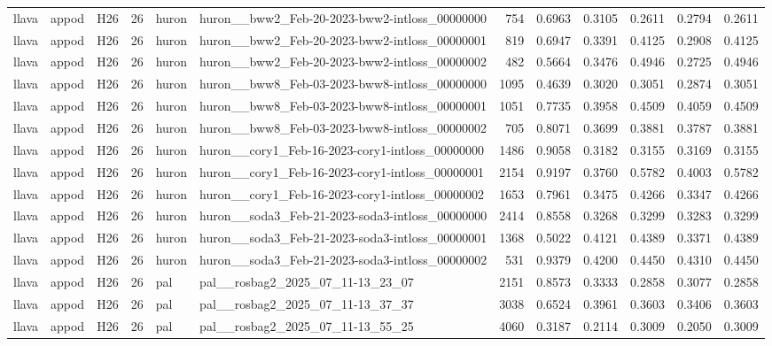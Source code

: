 \begin{table}[tbp]
\begin{tabular}{lllrllrrrrrr}
llava & appod & H26 & 26 & huron & huron\_\_bww2\_Feb-20-2023-bww2-intloss\_00000000 & 754 & 0.6963 & 0.3105 & 0.2611 & 0.2794 & 0.2611 \\
llava & appod & H26 & 26 & huron & huron\_\_bww2\_Feb-20-2023-bww2-intloss\_00000001 & 819 & 0.6947 & 0.3391 & 0.4125 & 0.2908 & 0.4125 \\
llava & appod & H26 & 26 & huron & huron\_\_bww2\_Feb-20-2023-bww2-intloss\_00000002 & 482 & 0.5664 & 0.3476 & 0.4946 & 0.2725 & 0.4946 \\
llava & appod & H26 & 26 & huron & huron\_\_bww8\_Feb-03-2023-bww8-intloss\_00000000 & 1095 & 0.4639 & 0.3020 & 0.3051 & 0.2874 & 0.3051 \\
llava & appod & H26 & 26 & huron & huron\_\_bww8\_Feb-03-2023-bww8-intloss\_00000001 & 1051 & 0.7735 & 0.3958 & 0.4509 & 0.4059 & 0.4509 \\
llava & appod & H26 & 26 & huron & huron\_\_bww8\_Feb-03-2023-bww8-intloss\_00000002 & 705 & 0.8071 & 0.3699 & 0.3881 & 0.3787 & 0.3881 \\
llava & appod & H26 & 26 & huron & huron\_\_cory1\_Feb-16-2023-cory1-intloss\_00000000 & 1486 & 0.9058 & 0.3182 & 0.3155 & 0.3169 & 0.3155 \\
llava & appod & H26 & 26 & huron & huron\_\_cory1\_Feb-16-2023-cory1-intloss\_00000001 & 2154 & 0.9197 & 0.3760 & 0.5782 & 0.4003 & 0.5782 \\
llava & appod & H26 & 26 & huron & huron\_\_cory1\_Feb-16-2023-cory1-intloss\_00000002 & 1653 & 0.7961 & 0.3475 & 0.4266 & 0.3347 & 0.4266 \\
llava & appod & H26 & 26 & huron & huron\_\_soda3\_Feb-21-2023-soda3-intloss\_00000000 & 2414 & 0.8558 & 0.3268 & 0.3299 & 0.3283 & 0.3299 \\
llava & appod & H26 & 26 & huron & huron\_\_soda3\_Feb-21-2023-soda3-intloss\_00000001 & 1368 & 0.5022 & 0.4121 & 0.4389 & 0.3371 & 0.4389 \\
llava & appod & H26 & 26 & huron & huron\_\_soda3\_Feb-21-2023-soda3-intloss\_00000002 & 531 & 0.9379 & 0.4200 & 0.4450 & 0.4310 & 0.4450 \\
llava & appod & H26 & 26 & pal & pal\_\_rosbag2\_2025\_07\_11-13\_23\_07 & 2151 & 0.8573 & 0.3333 & 0.2858 & 0.3077 & 0.2858 \\
llava & appod & H26 & 26 & pal & pal\_\_rosbag2\_2025\_07\_11-13\_37\_37 & 3038 & 0.6524 & 0.3961 & 0.3603 & 0.3406 & 0.3603 \\
llava & appod & H26 & 26 & pal & pal\_\_rosbag2\_2025\_07\_11-13\_55\_25 & 4060 & 0.3187 & 0.2114 & 0.3009 & 0.2050 & 0.3009 \\

\end{tabular}
\end{table}
